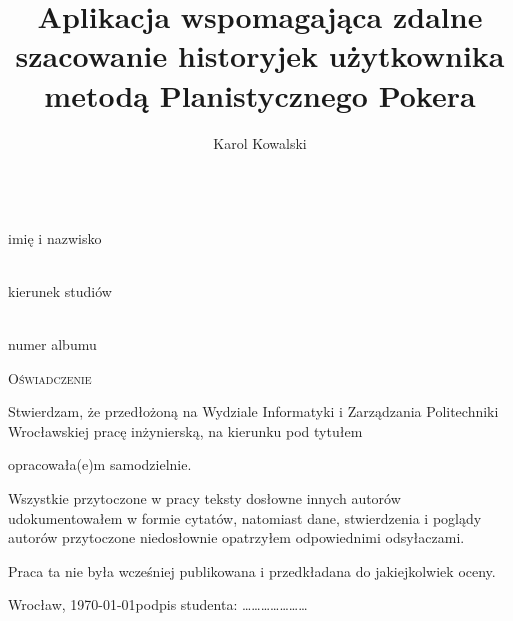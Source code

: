 ﻿\documentclass[12pt]{article}
\begin{document}
\maketitle

\noindent\author{Karol Kowalski}\\
imię i nazwisko

\noindent{}\\
kierunek studiów

\noindent{}\\
numer albumu

\vspace{1cm}
\begin{center}
\Large\textsc{Oświadczenie}
\end{center}

\vspace{1cm}

Stwierdzam, że przedłożoną na Wydziale Informatyki i Zarządzania Politechniki Wrocławskiej pracę inżynierską, na kierunku
pod tytułem
\title{Aplikacja wspomagająca zdalne szacowanie historyjek użytkownika metodą
Planistycznego Pokera}
opracowała(e)m samodzielnie. 
	
Wszystkie przytoczone w pracy teksty dosłowne innych autorów udokumentowałem w formie cytatów, natomiast dane, stwierdzenia i poglądy autorów przytoczone niedosłownie opatrzyłem odpowiednimi odsyłaczami.

Praca ta nie była wcześniej publikowana i przedkładana do jakiejkolwiek oceny.

\vspace{2cm}

\noindent Wrocław, \today \hfill podpis studenta: \dots\dots\dots\dots\dots\dots\dots
\end{document}
